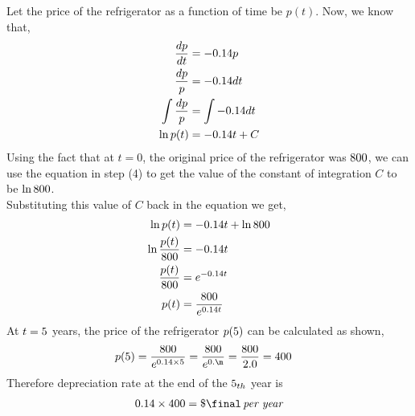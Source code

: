 \begin{solution}[\halfpage]
  Let the price of the refrigerator as a function of time be $p(t)$.
  Now, we know that,
  \begin{align}
    \dfrac{dp}{dt}    &= -0.14 p \\
    \dfrac{dp}{p}     &= -0.14 dt \\
    \int\dfrac{dp}{p} &= \int -0.14 dt \\
    \ln p(t)          &= -0.14 t + C
  \end{align}
  Using the fact that at $t=0$, the original price of the refrigerator 
  was $800$, we can use the equation in step (4) to get the value of 
  the constant of integration $C$ to be $\ln800$. \\
  Substituting this value of $C$ back in the equation we get,
  \begin{align}
    \ln p(t)                &= -0.14 t + \ln 800 \\
    \ln \dfrac{p(t)}{800} &= -0.14 t \\
    \dfrac{p(t)}{800}     &= e^{-0.14 t} \\
    p(t)                    &= \dfrac{800}{e^{0.14 t}}
  \end{align}
  At $t=5$ years, the price of the refrigerator $p(5)$ can be
  calculated as shown,
  \begin{align}
    p(\yrs) &= \dfrac{\cost}{e^{0.\dep\times\yrs}}
             = \dfrac{\cost}{e^{0.\m}} = \dfrac{\cost}{\calcaid}
             = \p
  \end{align}
  Therefore depreciation rate at the end of the $5_{th}$ year is
  \begin{align}
    0.\dep\times\p = \$\final\,\textit{per year}
  \end{align}

\end{solution}

